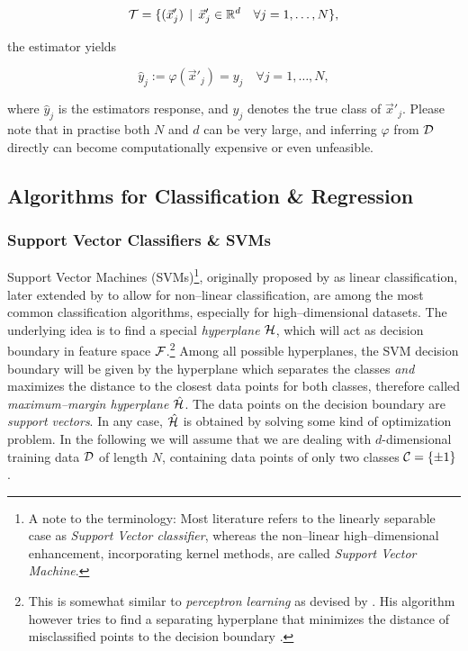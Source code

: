 \begin{equation}
\mathcal{T} = \{ (\vec x'_j) \, \mid \, \vec x'_j \in \mathbb{R}^d \quad \forall j = 1,\ldots,N \},
\end{equation}

the estimator yields

\begin{equation}
\hat y_j := \varphi({\vec x'_j}) = y_j \quad \forall j = 1,\ldots,N,
\end{equation}

where $\hat y_j$ is the estimators response, and $y_j$ denotes the true class of $\vec x'_j$. Please note that in practise both $N$ and $d$ can be very large, and inferring $\varphi$ from $\mathcal{D}$ directly can become computationally expensive or even unfeasible.

\subsection{Algorithms for Classification \& Regression}
\label{subsec:algorithms-classification-and-regression}
\subsubsection{Support Vector Classifiers \& SVMs}

Support Vector Machines (SVMs)\footnote{A note to the terminology: Most literature refers to the linearly separable case as \emph{Support Vector classifier}, whereas the non--linear high--dimensional enhancement, incorporating kernel methods, are called \emph{Support Vector Machine}.}, originally proposed by \citet{vapnik1963} as linear classification, later extended by \citet{cortes1995} to allow for non--linear classification, are among the most common classification algorithms, especially for high--dimensional datasets. The underlying idea is to find a special \emph{hyperplane} $\mathcal{H}$, which will act as decision boundary in feature space $\mathcal{F}$.\footnote{This is somewhat similar to \emph{perceptron learning} as devised by \citet{rosenblatt1958}. His algorithm however tries to find a separating hyperplane that minimizes the distance of misclassified points to the decision boundary \citep{hastie2001}.} Among all possible hyperplanes, the SVM decision boundary will be given by the hyperplane which separates the classes \emph{and} maximizes the distance to the closest data points for both classes, therefore called \emph{maximum--margin hyperplane} $\hat {\mathcal{H}}$. The data points on the decision boundary are \emph{support vectors}. In any case, $\hat {\mathcal{H}}$ is obtained by solving some kind of optimization problem. In the following we will assume that we are dealing with $d$-dimensional training data $\mathcal{D}$ of length $N$, containing data points of only two classes $\mathcal{C} = \{ \pm 1 \}$. \\

